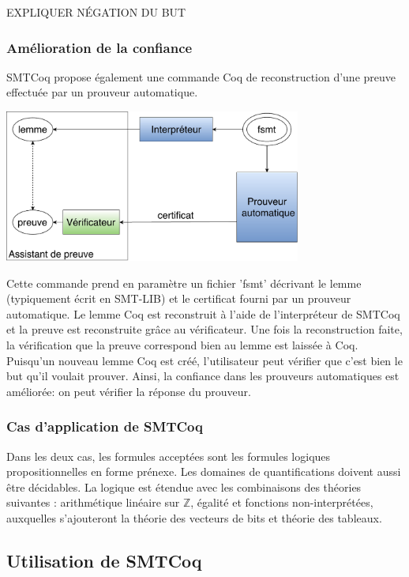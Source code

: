 \documentclass[11pt]{article}
\begin{document}
EXPLIQUER NÉGATION DU BUT


\subsubsection{Amélioration de la confiance}


SMTCoq propose également une commande Coq de reconstruction d'une preuve effectuée par un prouveur automatique.

\begin{center}
\includegraphics[height=5cm]{Confiance.pdf}
\end{center}

 Cette commande prend en paramètre un fichier 'fsmt' décrivant le lemme (typiquement écrit en SMT-LIB) et le certificat fourni par un prouveur automatique. Le lemme Coq est reconstruit à l'aide de l'interpréteur de SMTCoq et la preuve est reconstruite grâce au vérificateur. Une fois la reconstruction faite, la vérification que la preuve correspond bien au lemme est laissée à Coq. \\

Puisqu'un nouveau lemme Coq est créé, l'utilisateur peut vérifier que c'est bien le but qu'il voulait prouver. Ainsi, la confiance dans les prouveurs automatiques est améliorée: on peut vérifier la réponse du prouveur.


\subsubsection{Cas d'application de SMTCoq}

Dans les deux cas, les formules acceptées sont les formules logiques propositionnelles en forme prénexe. Les domaines de quantifications doivent aussi être décidables. La logique est étendue avec les combinaisons des théories suivantes : arithmétique linéaire sur $\mathbb{Z}$, égalité et fonctions non-interprétées, auxquelles s'ajouteront la théorie des vecteurs de bits et théorie des tableaux. 

\subsection{Utilisation de SMTCoq}
\end{document}
